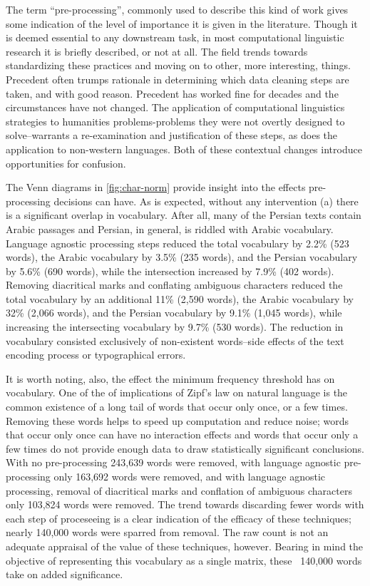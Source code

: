 \documentclass[12pt, oneside]{report}
\begin{document}
\par 
The term ``pre-processing'', commonly used to describe this kind of work gives some indication of the level of importance it is given in the literature. Though it is deemed essential to any downstream task, in most computational linguistic research it is briefly described, or not at all. The field trends towards standardizing these practices and moving on to other, more interesting, things. Precedent often trumps rationale in determining which data cleaning steps are taken, and with good reason. Precedent has worked fine for decades and the circumstances have not changed. The application of computational linguistics strategies to humanities problems-problems they were not overtly designed to solve–warrants a re-examination and justification of these steps, as does the application to non-western languages. Both of these contextual changes introduce opportunities for confusion.
\par 
The Venn diagrams in \autoref{fig:char-norm} provide insight into the effects pre-processing decisions can have. As is expected, without any intervention (a) there is a significant overlap in vocabulary. After all, many of the Persian texts contain Arabic passages and Persian, in general, is riddled with Arabic vocabulary. Language agnostic processing steps reduced the total vocabulary by 2.2\% (523 words), the Arabic vocabulary by 3.5\% (235 words), and the Persian vocabulary by 5.6\% (690 words), while the intersection increased by 7.9\% (402 words). Removing diacritical marks and conflating ambiguous characters reduced the total vocabulary by an additional 11\% (2,590 words), the Arabic vocabulary by 32\% (2,066 words), and the Persian vocabulary by 9.1\% (1,045 words), while increasing the intersecting vocabulary by 9.7\% (530 words). The reduction in vocabulary consisted exclusively of non-existent words–side effects of the text encoding process or typographical errors. 
\par
It is worth noting, also, the effect the minimum frequency threshold has on vocabulary. One of the of implications of Zipf's law on natural language is the common existence of a long tail of words that occur only once, or a few times. Removing these words helps to speed up computation and reduce noise; words that occur only once can have no interaction effects and words that occur only a few times do not provide enough data to draw statistically significant conclusions. With no pre-processing 243,639 words were removed, with language agnostic pre-processing only 163,692 words were removed, and with language agnostic processing, removal of diacritical marks and conflation of ambiguous characters only 103,824 words were removed. The trend towards discarding fewer words with each step of proceseeing is a clear indication of the efficacy of these techniques; nearly 140,000 words were sparred from removal. The raw count is not an adequate appraisal of the value of these techniques, however. Bearing in mind the objective of representing this vocabulary as a single matrix, these ~140,000 words take on added significance. 
\end{document}
